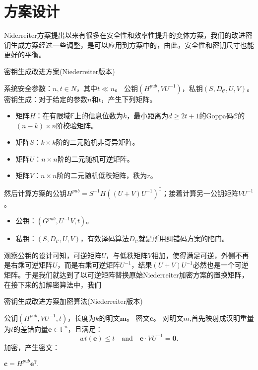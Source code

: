 \section{方案设计}
Niderreiter方案提出以来有很多在安全性和效率性提升的变体方案，我们的改进密钥生成方案经过一些调整，是可以应用到方案中的，由此，安全性和密钥尺寸也能更好的平衡。

\begin{breakablealgorithm}
	\small
	\renewcommand{\algorithmicrequire}{\textbf{Input:}}
	\renewcommand{\algorithmicensure}{\textbf{Output:}}
	\caption{密钥生成改进方案(Niederreiter版本)}
	\label{alg:NewKeyGenN}
	\begin{algorithmic}[1]
		\Require
		系统安全参数：$n,t \in N$，其中$t \ll n$。
		\Ensure
		公钥$(H^{pub},VU^{-1})$，私钥$(S,D_\mathcal{C},U,V)$。
		\State
		密钥生成：对于给定的参数$n$和$t$，产生下列矩阵。
		\begin{itemize}
			\item 矩阵$H$：在有限域$\mathbb{F}$上的信息位数为$k$，最小距离为$d \geq 2t + 1$的Goppa码$\mathcal{C}$的$(n - k) \times n$阶校验矩阵。
			\item 矩阵$S$：$k \times k$阶的二元随机非奇异矩阵。
			\item 矩阵$U$：$n \times n$阶的二元随机可逆矩阵。
			\item 矩阵$V$：$n \times n$阶的二元随机低秩矩阵，秩为$r$。
		\end{itemize}
		\State
		然后计算方案的公钥$H^{pub} = S^{-1}H((U + V)U^{-1})^\mathtt{T}$；接着计算另一公钥矩阵$VU^{-1}$。
		\begin{itemize}
			\item 公钥：$(G^{pub},U^{-1}V,t)$。
			\item 私钥：$(S,D_\mathcal{C},U,V)$，有效译码算法$D_\mathcal{C}$就是所用纠错码方案的陷门。
		\end{itemize}
	\end{algorithmic}
\end{breakablealgorithm}

观察公钥的设计可知，可逆矩阵$U$，与低秩矩阵$V$相加，使得满足可逆，外侧不再是右乘可逆矩阵$U$，而是右乘可逆矩阵$U^{-1}$，结果$(U + V)U^{-1}$必然也是一个可逆矩阵。于是我们就达到了以可逆矩阵替换原始Niederreiter加密方案的置换矩阵，在接下来的加解密算法中，我们

\begin{breakablealgorithm}
	\small
	\renewcommand{\algorithmicrequire}{\textbf{Input:}}
	\renewcommand{\algorithmicensure}{\textbf{Output:}}
	\caption{密钥生成改进方案加密算法(Niederreiter版本)}
	\label{alg:NeweEnN}
	\begin{algorithmic}[1]
		\Require
		公钥$(H^{pub},VU^{-1},t)$，长度为$k$的明文$\mathbf{m}$。
		\Ensure
		密文$\mathbf{c}$。
		\State
		对明文$m$,首先映射成汉明重量为$t$的差错向量$\mathbf{e} \in \mathbb{F}^n$，且满足：
		\begin{equation}
		wt(\mathbf{e})\leq t\quad \mbox{and}\quad \mathbf{e}\cdot VU^{-1} = \mathbf{0}.
		\end{equation}
		\State
		加密，产生密文：
		
		\centering $\mathbf{c} = H^{pub}\mathbf{e}^\mathtt{T}.$
	\end{algorithmic}
\end{breakablealgorithm}

